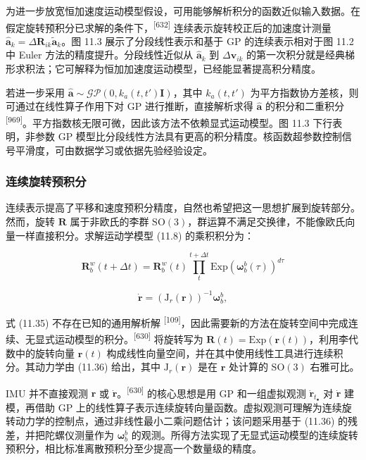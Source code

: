 为进一步放宽恒加速度运动模型假设，可用能够解析积分的函数近似输入数据。在假定旋转预积分已求解的条件下，\textsuperscript{[632]} 连续表示旋转校正后的加速度计测量 $\hat{\mathbf a}_k=\Delta\boldsymbol R_{ik}\tilde{\mathbf a}_k$。图 11.3 展示了分段线性表示和基于 GP 的连续表示相对于图 11.2 中 Euler 方法的精度提升。分段线性近似从 $\hat{\mathbf a}_k$ 到 $\Delta\boldsymbol v_{ik}$ 的第一次积分就是经典梯形求积法；它可解释为恒加加速度运动模型，已经能显著提高积分精度。

若进一步采用 $\hat{\mathbf a}\sim\mathcal{GP}(0,k_a(t,t')\mathbf I)$，其中 $k_a(t,t')$ 为平方指数协方差核，则可通过在线性算子作用下对 GP 进行推断，直接解析求得 $\hat{\mathbf a}$ 的积分和二重积分 \textsuperscript{[969]}。平方指数核无限可微，因此该方法不依赖显式运动模型。图 11.3 下行表明，非参数 GP 模型比分段线性方法具有更高的积分精度。核函数超参数控制信号平滑度，可由数据学习或依据先验经验设定。

\subsubsection{连续旋转预积分}

连续表示提高了平移和速度预积分精度，自然也希望把这一思想扩展到旋转部分。然而，旋转 $\boldsymbol R$ 属于非欧氏的李群 $\mathrm{SO}(3)$，群运算不满足交换律，不能像欧氏向量一样直接积分。求解运动学模型 (11.8) 的乘积积分为：

\begin{equation}
\boldsymbol {R} _ {b} ^ {w} (t + \Delta t) = \boldsymbol {R} _ {b} ^ {w} (t) \prod_ {t} ^ {t + \Delta t} \mathrm{Exp} \left(\boldsymbol {\omega} _ {b} ^ {b} (\tau)\right) ^ {d \tau}\tag{11.35}
\end{equation}

\begin{equation}
\dot {\mathbf {r}} = \left(\mathrm{J} _ {r} (\mathbf {r})\right) ^ {- 1} \boldsymbol {\omega} _ {b} ^ {b},\tag{11.36}
\end{equation}

式 (11.35) 不存在已知的通用解析解 \textsuperscript{[109]}，因此需要新的方法在旋转空间中完成连续、无显式运动模型的积分。\textsuperscript{[630]} 将旋转写为 $\boldsymbol R(t)=\mathrm{Exp}(\mathbf r(t))$，利用李代数中的旋转向量 $\mathbf r(t)$ 构成线性向量空间，并在其中使用线性工具进行连续积分。其动力学由 (11.36) 给出，其中 $\mathrm{J}_r(\mathbf r)$ 是在 $\mathbf r$ 处计算的 $\mathrm{SO}(3)$ 右雅可比。

IMU 并不直接观测 $\mathbf r$ 或 $\dot{\mathbf r}$。\textsuperscript{[630]} 的核心思想是用 GP 和一组虚拟观测 $\dot{\mathbf r}_{t_\bullet}$ 对 $\dot{\mathbf r}$ 建模，再借助 GP 上的线性算子表示连续旋转向量函数。虚拟观测可理解为连续旋转动力学的控制点，通过非线性最小二乘问题估计；该问题采用基于 (11.36) 的残差，并把陀螺仪测量作为 $\boldsymbol\omega_b^b$ 的观测。所得方法实现了无显式运动模型的连续旋转预积分，相比标准离散预积分至少提高一个数量级的精度。

